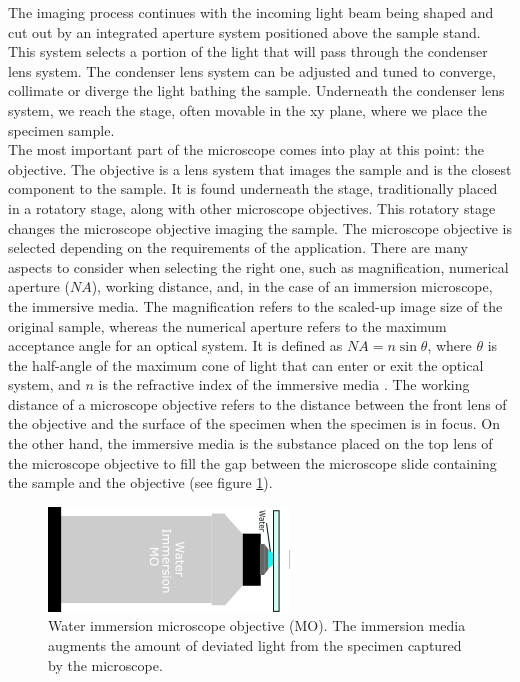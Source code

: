 \documentclass[letterpaper,12pt,oneside]{book}
\begin{document}
\noindent The imaging process continues with the incoming light beam being shaped and cut out by an integrated aperture system positioned above the sample stand. This system selects a portion of the light that will pass through the condenser lens system. The condenser lens system can be adjusted and tuned to converge, collimate or diverge the light bathing the sample. Underneath the condenser lens system, we reach the stage, often movable in the xy plane, where we place the specimen sample. \\The most important part of the microscope comes into play at this point: the objective. The objective is a lens system that images the sample and is the closest component to the sample. It is found underneath the stage, traditionally placed in a rotatory stage, along with other microscope objectives. This rotatory stage changes the microscope objective imaging the sample. The microscope objective is selected depending on the requirements of the application. There are many aspects to consider when selecting the right one, such as magnification, numerical aperture ($NA$), working distance, and, in the case of an immersion microscope, the immersive media. The magnification refers to the scaled-up image size of the original sample, whereas the numerical aperture refers to the maximum acceptance angle for an optical system. It is defined as $NA = n \sin{\theta}$, where $\theta$ is the half-angle of the maximum cone of light that can enter or exit the optical system, and $n$ is the refractive index of the immersive media \cite{svelto2010principles}. The working distance of a microscope objective refers to the distance between the front lens of the objective and the surface of the specimen when the specimen is in focus. On the other hand, the immersive media is the substance placed on the top lens of the microscope objective to fill the gap between the microscope slide containing the sample and the objective (see figure \ref{MOWater}). 
\begin{figure}[H]
    \centering
    \includegraphics[angle=90]{Imagenes teoria/nikon-objective.png}
    \caption{Water immersion microscope objective (MO). The immersion media augments the amount of deviated light from the specimen captured by the microscope.}
    \label{MOWater}
\end{figure}
\end{document}
